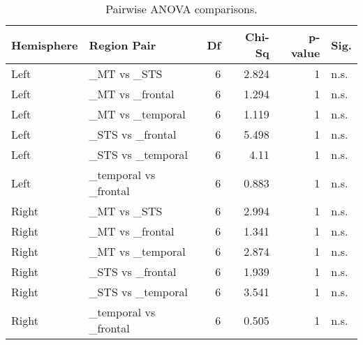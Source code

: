 \begin{table}[h]
\centering
\begin{tabular}{llrrrl}
\toprule
 Hemisphere   & Region Pair           &   Df &   Chi-Sq &   p-value & Sig.   \\
\midrule
 Left         & \_MT vs \_STS           &    6 &    2.824 &         1 & n.s.   \\
 Left         & \_MT vs \_frontal       &    6 &    1.294 &         1 & n.s.   \\
 Left         & \_MT vs \_temporal      &    6 &    1.119 &         1 & n.s.   \\
 Left         & \_STS vs \_frontal      &    6 &    5.498 &         1 & n.s.   \\
 Left         & \_STS vs \_temporal     &    6 &    4.11  &         1 & n.s.   \\
 Left         & \_temporal vs \_frontal &    6 &    0.883 &         1 & n.s.   \\
 Right        & \_MT vs \_STS           &    6 &    2.994 &         1 & n.s.   \\
 Right        & \_MT vs \_frontal       &    6 &    1.341 &         1 & n.s.   \\
 Right        & \_MT vs \_temporal      &    6 &    2.874 &         1 & n.s.   \\
 Right        & \_STS vs \_frontal      &    6 &    1.939 &         1 & n.s.   \\
 Right        & \_STS vs \_temporal     &    6 &    3.541 &         1 & n.s.   \\
 Right        & \_temporal vs \_frontal &    6 &    0.505 &         1 & n.s.   \\
\bottomrule
\end{tabular}
\caption{Pairwise ANOVA comparisons.}
\end{table}